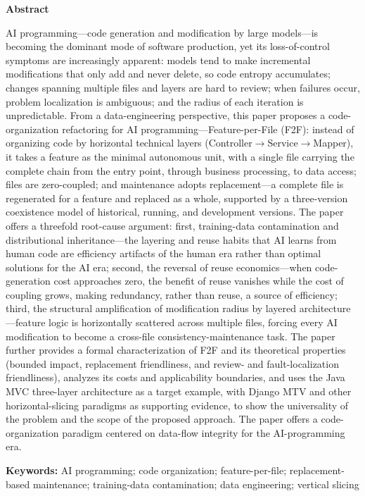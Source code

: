 \documentclass[11pt,a4paper]{ctexart}
\begin{document}
\begin{center}
\textbf{Abstract}
\end{center}
\noindent AI programming---code generation and modification by large models---is becoming the dominant mode of software production, yet its loss-of-control symptoms are increasingly apparent: models tend to make incremental modifications that only add and never delete, so code entropy accumulates; changes spanning multiple files and layers are hard to review; when failures occur, problem localization is ambiguous; and the radius of each iteration is unpredictable. From a data-engineering perspective, this paper proposes a code-organization refactoring for AI programming---Feature-per-File (F2F): instead of organizing code by horizontal technical layers (Controller$\rightarrow$Service$\rightarrow$Mapper), it takes a feature as the minimal autonomous unit, with a single file carrying the complete chain from the entry point, through business processing, to data access; files are zero-coupled; and maintenance adopts replacement---a complete file is regenerated for a feature and replaced as a whole, supported by a three-version coexistence model of historical, running, and development versions. The paper offers a threefold root-cause argument: first, training-data contamination and distributional inheritance---the layering and reuse habits that AI learns from human code are efficiency artifacts of the human era rather than optimal solutions for the AI era; second, the reversal of reuse economics---when code-generation cost approaches zero, the benefit of reuse vanishes while the cost of coupling grows, making redundancy, rather than reuse, a source of efficiency; third, the structural amplification of modification radius by layered architecture---feature logic is horizontally scattered across multiple files, forcing every AI modification to become a cross-file consistency-maintenance task. The paper further provides a formal characterization of F2F and its theoretical properties (bounded impact, replacement friendliness, and review- and fault-localization friendliness), analyzes its costs and applicability boundaries, and uses the Java MVC three-layer architecture as a target example, with Django MTV and other horizontal-slicing paradigms as supporting evidence, to show the universality of the problem and the scope of the proposed approach. The paper offers a code-organization paradigm centered on data-flow integrity for the AI-programming era.

\noindent\textbf{Keywords:} AI programming; code organization; feature-per-file; replacement-based maintenance; training-data contamination; data engineering; vertical slicing
\end{document}
